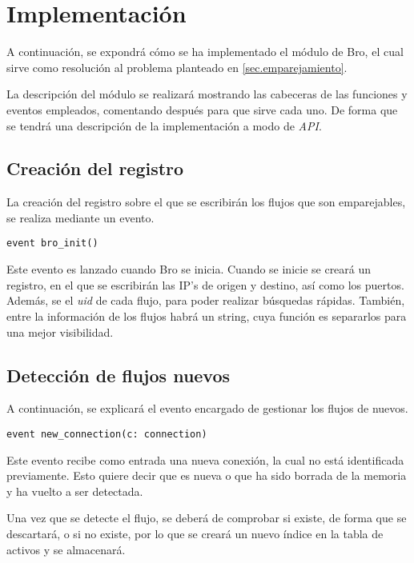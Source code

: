 \chapter{Implementación}\label{implementacion}

A continuación, se expondrá cómo se ha implementado el módulo de Bro, el cual sirve como resolución al problema planteado en 
\ref{sec.emparejamiento}.

\intro La descripción del módulo se realizará mostrando las cabeceras de las funciones y eventos empleados, comentando después para 
que sirve cada uno. De forma que se tendrá una descripción de la implementación a modo de \textit{API}.

\section{Creación del registro}

La creación del registro sobre el que se escribirán los flujos que son emparejables, se realiza mediante un evento.

\begin{lstlisting}[style=CodigoC]
event bro_init()

\end{lstlisting}

\intro Este evento es lanzado cuando Bro se inicia. Cuando se inicie se creará un registro, en el que se escribirán las IP's de origen 
y destino, así como los puertos. Además, se el \textit{uid} de cada flujo, para poder realizar búsquedas rápidas. También, entre la 
información de los flujos habrá un string, cuya función es separarlos para una mejor visibilidad.

\section{Detección de flujos nuevos}

A continuación, se explicará el evento encargado de gestionar los flujos de nuevos.

\begin{lstlisting}[style=CodigoC]
event new_connection(c: connection)

\end{lstlisting}

\intro Este evento recibe como entrada una nueva conexión, la cual no está identificada previamente. Esto quiere decir que es nueva
o que ha sido borrada de la memoria y ha vuelto a ser detectada.

\intro Una vez que se detecte el flujo, se deberá de comprobar si existe, de forma que se descartará, o si no existe, por lo que se 
creará un nuevo índice en la tabla de activos y se almacenará.

